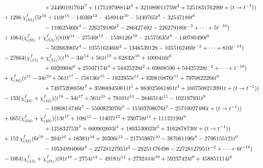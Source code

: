 \documentclass[letterpaper, 11pt]{article}
\newcommand{\nn}{\nonumber}
\begin{document}
{\begin{align}
    &\hspace{2.5cm}+24490191704 t^7+117519798814 t^5+321089011759 t^3+525183176299t+(t\rightarrow t^{-1}))\nn\\
    &+1296\,\chi^f_{(55)}(5 t^{16}+110 t^{14}-14030 t^{12}-458914 t^{10}-5440765 t^8-32547180 t^6\nn\\
    &\hspace{2.5cm}-110625460t^4-226279180 t^2-286427492-226279180 t^{-2}+\cdots+5t^{-16})\nn\\
    &+1064(\chi^f_{(35)}+\chi^f_{(53)})(810 t^{14}-27540 t^{12}-1538126 t^{10}-21575635 t^8-140780490 t^6\nn\\
    &\hspace{2.5cm}-502663905 t^4-1055162460t^2-1346539128-1055162460t^{-2}+\cdots+810t^{-14})\nn\\
    &-27664(\chi^f_{(15)}+\chi^f_{(51)})(t^{16}-34 t^{14}+561 t^{12}+62832 t^{10}+1000416 t^8\nn\\
    &\hspace{2.5cm}+6920904 t^6+25507174 t^4+54425228t^2+69808596+54425228t^{-2}+\cdots+t^{-16})\nn\\
    &+\chi^f_{(44)}(t^{21}-34 t^{19}+561 t^{17}-158136 t^{15}-1922955 t^{13}+320810876 t^{11}+7970822266t^9\nn\\
    &\hspace{2.5cm}+74975208858 t^7+359889450611 t^5+983025661861 t^3+1607508212091t+(t\rightarrow t^{-1}))\nn\\
    &-133(\chi^f_{(24)}+\chi^f_{(42)})(t^{19}-34 t^{17}+561 t^{15}+79101 t^{13}-2846514 t^{11}-102197931 t^9\nn\\
    &\hspace{2.5cm}-1080814746t^7-5500823076 t^5-15503708076 t^3-25710027486t+(t\rightarrow t^{-1}))\nn\\
    &+665(\chi^f_{(04)}+\chi^f_{(40)})(13 t^{17}+108 t^{15}-11407 t^{13}+230758 t^{11}+11122199 t^9\nn\\
    &\hspace{2.5cm}+125832753 t^7+660902603t^5+1893530023 t^3+3162878730t+(t\rightarrow t^{-1}))\nn\\
    &+152\,\chi^f_{(33)}(6 t^{18}-204 t^{16}+18381 t^{14}+20306 t^{12}-21755987 t^{10}-387061196 t^8-2796155121t^6\nn\\
    &\hspace{2.5cm}-10534894066 t^4-22728127951 t^2-29251476496-22728127951 t^{-2}+\cdots+6t^{-18})\nn\\
    &-1064(\chi^f_{(13)}+\chi^f_{(31)})(81 t^{16}-2754 t^{14}-49181 t^{12}+2732444 t^{10}+59237424 t^8+458851114 t^6\nn\\

\end{align}}
\end{document}
